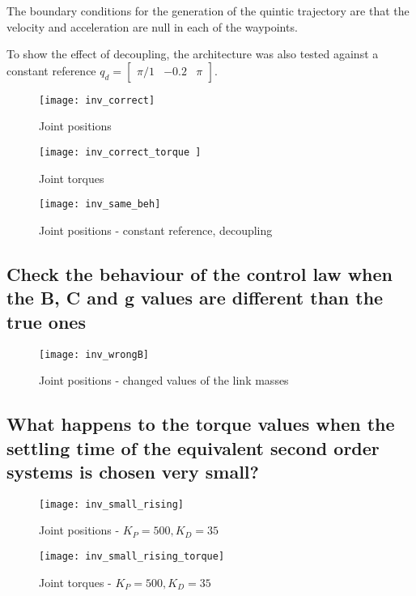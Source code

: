 The boundary conditions for the generation of the quintic trajectory are that the velocity and acceleration are null in each of the waypoints.

To show the effect of decoupling, the architecture was also tested against a constant reference $q_d=\begin{bmatrix}
\pi/1& -0.2&\pi
\end{bmatrix}$.

\begin{figure}[H]
\begin{minipage}{0.5\textwidth}
\centering
\texttt{[image: inv\_correct]}
\caption{Joint positions}
\end{minipage}
\begin{minipage}{0.5\textwidth}
\centering
\texttt{[image: inv\_correct\_torque	]}
\caption{Joint torques}
\end{minipage}
\end{figure}

\begin{figure}[H]
\centering
\texttt{[image: inv\_same\_beh]}
\caption{Joint positions - constant reference, decoupling}
\end{figure}

\subsection{Check the behaviour of the control law when the B, C and g values are different than the true ones}

\begin{figure}[H]
\centering
\texttt{[image: inv\_wrongB]}
\caption{Joint positions - changed values of the link masses}
\end{figure}

\subsection{What happens to the torque values when the settling time of the equivalent second order systems is chosen very small?}

\begin{figure}[H]
\centering
\texttt{[image: inv\_small\_rising]}
\caption{Joint positions - $K_P=500,K_D=35$}
\end{figure}
\begin{figure}[H]
\centering
\texttt{[image: inv\_small\_rising\_torque]}
\caption{Joint torques - $K_P=500,K_D=35$}
\end{figure}